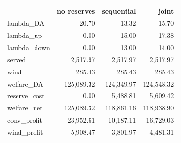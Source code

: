 \begin{tabular}{lrrr}
\toprule
 & no reserves & sequential & joint \\
\midrule
lambda\_DA & 20.70 & 13.32 & 15.70 \\
lambda\_up & 0.00 & 15.00 & 17.38 \\
lambda\_down & 0.00 & 13.00 & 14.00 \\
served & 2,517.97 & 2,517.97 & 2,517.97 \\
wind & 285.43 & 285.43 & 285.43 \\
welfare\_DA & 125,089.32 & 124,349.97 & 124,548.32 \\
reserve\_cost & 0.00 & 5,488.81 & 5,609.42 \\
welfare\_net & 125,089.32 & 118,861.16 & 118,938.90 \\
conv\_profit & 23,952.61 & 10,187.11 & 16,729.03 \\
wind\_profit & 5,908.47 & 3,801.97 & 4,481.31 \\
\bottomrule
\end{tabular}
